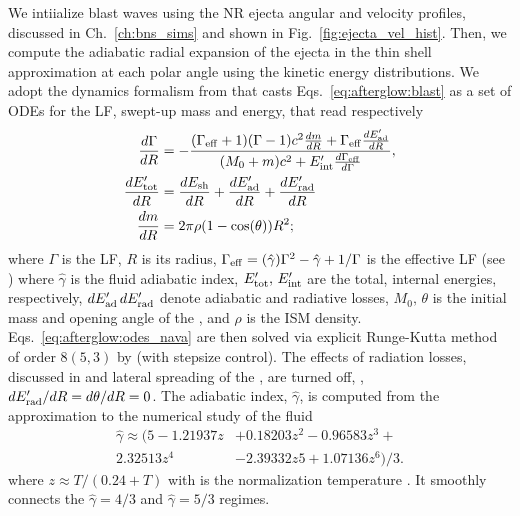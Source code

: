 %
We intiialize blast waves using the \ac{NR} ejecta angular and velocity profiles, 
discussed in %
Ch.~\ref{ch:bns_sims} and shown in Fig.~\ref{fig:ejecta_vel_hist}.
%
Then, we compute the adiabatic radial expansion of the ejecta in 
the thin shell approximation at each polar angle using the kinetic 
energy distributions.
%
We adopt the \blast{} dynamics formalism from \citet{Nava:2013} that casts 
Eqs.~\eqref{eq:afterglow:blast} as a set of \acp{ODE} for the \blast{} \ac{LF},
swept-up mass and energy, that read respectively 
%
\begin{subequations}
    \label{eq:afterglow:odes_nava}
    \begin{align}
    \frac{d\Gamma}{dR} &= -\frac{(\Gamma_{\rm eff} + 1)(\Gamma - 1) c^2\frac{dm}{dR} + \Gamma_{\rm eff}\frac{dE'_{\rm ad}}{dR}}{(M_0 + m) c^2 + E'_{\rm int}\frac{d\Gamma_{\rm eff}\rm }{d\Gamma}}, \\
    \frac{dE'_{\rm tot}}{dR} &= \frac{dE_{\rm sh}}{dR} + \frac{dE'_{\rm ad}}{dR} + \frac{dE'_{\rm rad}}{dR} \\
    \frac{dm}{dR} &= 2 \pi \rho (1 - \cos(\theta)) R^2;
    \end{align}
\end{subequations}
%
where $\Gamma$ is the \blast{} \ac{LF}, $R$ is its radius, 
$\Gamma_{\rm eff} = (\hat{\gamma})\Gamma^2-\hat{\gamma}+1 / \Gamma$ is the effective 
\ac{LF} (see \citet{Nava:2013}) where $\hat{\gamma}$ is the fluid adiabatic index, 
$E'_{\rm tot},\, E'_{\rm int}$ 
are the total, internal energies, respectively, $dE'_{\rm ad}\, dE'_{\rm rad}$ denote 
adiabatic and radiative losses, $M_0,\, \theta$ is the initial mass and opening angle
of the \blast{}, and $\rho$ is the \ac{ISM} density.
%
Eqs.~\ref{eq:afterglow:odes_nava} are then solved via 
explicit Runge-Kutta method of order $8(5,3)$ by \citet{Dormand:1980} (with stepsize control).
%
The effects of radiation losses, discussed in \citet{Nava:2013} and lateral 
spreading of the \blast{}, \citep[\eg][]{Granot:2012} are turned off,
\ie, $d E'_{\rm rad}/dR = d\theta / dR = 0$.
%
The adiabatic index, $\hat{\gamma}$, is computed from the approximation to the 
numerical study of the \trans{} fluid \citep{Service:1986}
%
\begin{eqnarray}
\hat{\gamma} \approx (5 - 1.21937z &+ 0.18203z^2 - 0.96583z^3 + \\
2.32513z^4 &- 2.39332z 5 + 1.07136z^6)/3.
\end{eqnarray}
% 
where $z \approx T/(0.24 + T)$ with is the normalization temperature
\citep{Peer:2012}.
%
It smoothly connects the 
$\hat{\gamma}=4/3$ and $\hat{\gamma}=5/3$ regimes. 

